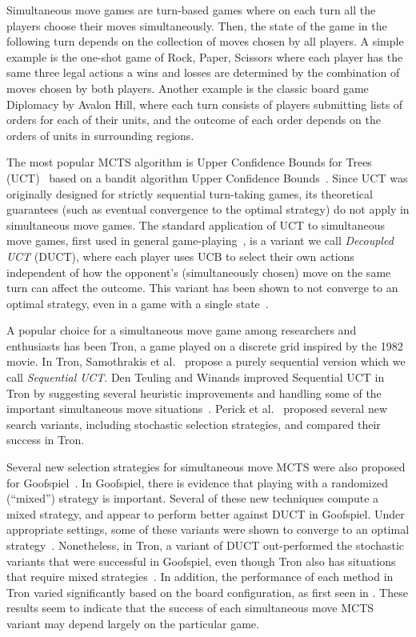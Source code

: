 \documentclass[conference]{IEEEtran}
\begin{document}
Simultaneous move games are turn-based games where on each turn all the players choose their moves simultaneously.
Then, the state of the game in the following turn depends on the collection of moves chosen by all players. 
A simple example is the one-shot game of Rock, Paper, Scissors where each player has the same three legal actions 
a wins and losses are determined by the combination of moves chosen by both players. 
Another example is the classic board game Diplomacy by Avalon Hill, where each turn consists of players submitting 
lists of orders for each of their units, and the outcome of each order depends on the orders of units in surrounding regions. 

The most popular MCTS algorithm is Upper Confidence Bounds for Trees (UCT)~\cite{Kocsis06Bandit} based on a bandit algorithm 
Upper Confidence Bounds~\cite{Auer02Finite}. Since UCT was originally 
designed for strictly sequential turn-taking games, its theoretical guarantees (such as eventual convergence to the optimal 
strategy) do not apply in simultaneous move games. The standard application of UCT to simultaneous move games, first used in 
general game-playing~\cite{Finnsson08}, is a variant we call {\it Decoupled UCT} (DUCT), where each player uses UCB to select 
their own actions independent of how the opponent's (simultaneously chosen) move on the same turn can affect the outcome. 
This variant has been shown to not converge to an optimal strategy, even in a game with a single state~\cite{Shafiei09}. 

A popular choice for a simultaneous move game among researchers and enthusiasts has been Tron, a game played on a discrete 
grid inspired by the 1982 movie.
In Tron, Samothrakis et al.~\cite{Samothrakis10Tron} propose a purely sequential version which we call {\it Sequential UCT}. 
Den Teuling and Winands improved Sequential UCT in Tron by suggesting several heuristic improvements and handling some of the 
important simultaneous move situations~\cite{DenTeuling12Tron}. Perick et al.~\cite{Perick12Comparison} proposed several new 
search variants, including stochastic selection strategies, and compared their success in Tron. 

Several new selection strategies for simultaneous move MCTS were also proposed for Goofspiel~\cite{Lanctot13Goofspiel}. In Goofspiel, 
there is evidence that playing with a randomized (``mixed'') strategy is important. 
Several of these new techniques compute a mixed strategy, and appear to perform better against DUCT in Goofspiel. 
Under appropriate settings, some of these variants were shown to converge to an optimal strategy~\cite{Lisy13Computing}. 
Nonetheless, in Tron, a variant of DUCT out-performed the stochastic variants that were successful in Goofspiel, even though Tron 
also has situations that require mixed strategies~\cite{Lanctot13Tron}. 
In addition, the performance of each method in Tron varied significantly based on the board configuration, as first seen 
in \cite{DenTeuling12Tron}.
These results seem to indicate that the success of each simultaneous move MCTS variant may depend largely on the particular game. 
\end{document}
